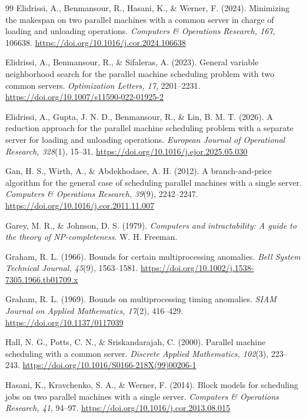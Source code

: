 \documentclass[11pt]{article}
\begin{document}
\begin{thebibliography}{99}
Elidrissi, A., Benmansour, R., Hasani, K., \& Werner, F. (2024).
Minimizing the makespan on two parallel machines with a common server in charge of loading and unloading operations.
\emph{Computers \& Operations Research, 167}, 106638.
\url{https://doi.org/10.1016/j.cor.2024.106638}

Elidrissi, A., Benmansour, R., \& Sifaleras, A. (2023).
General variable neighborhood search for the parallel machine scheduling problem with two common servers.
\emph{Optimization Letters, 17}, 2201--2231.
\url{https://doi.org/10.1007/s11590-022-01925-2}

Elidrissi, A., Gupta, J. N. D., Benmansour, R., \& Lin, B. M. T. (2026).
A reduction approach for the parallel machine scheduling problem with a separate server for loading and unloading operations.
\emph{European Journal of Operational Research, 328}(1), 15--31.
\url{https://doi.org/10.1016/j.ejor.2025.05.030}

Gan, H. S., Wirth, A., \& Abdekhodaee, A. H. (2012).
A branch-and-price algorithm for the general case of scheduling parallel machines with a single server.
\emph{Computers \& Operations Research, 39}(9), 2242--2247.
\url{https://doi.org/10.1016/j.cor.2011.11.007}

Garey, M. R., \& Johnson, D. S. (1979).
\emph{Computers and intractability: A guide to the theory of NP-completeness}.
W. H. Freeman.

Graham, R. L. (1966).
Bounds for certain multiprocessing anomalies.
\emph{Bell System Technical Journal, 45}(9), 1563--1581. 
\url{https://doi.org/10.1002/j.1538-7305.1966.tb01709.x}

Graham, R. L. (1969).
Bounds on multiprocessing timing anomalies.
\emph{SIAM Journal on Applied Mathematics, 17}(2), 416--429.
\url{https://doi.org/10.1137/0117039}

Hall, N. G., Potts, C. N., \& Sriskandarajah, C. (2000).
Parallel machine scheduling with a common server.
\emph{Discrete Applied Mathematics, 102}(3), 223--243.
\url{https://doi.org/10.1016/S0166-218X(99)00206-1}

Hasani, K., Kravchenko, S. A., \& Werner, F. (2014).
Block models for scheduling jobs on two parallel machines with a single server.
\emph{Computers \& Operations Research, 41}, 94--97.
\url{https://doi.org/10.1016/j.cor.2013.08.015}


\end{thebibliography}
\end{document}
